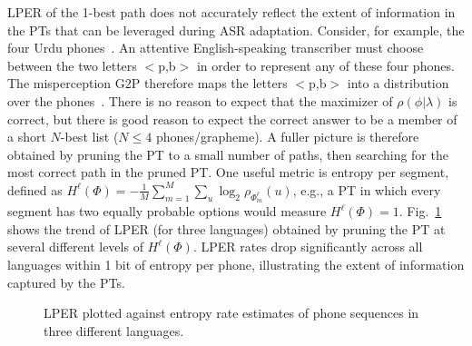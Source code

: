 

LPER of the 1-best path does not
accurately reflect the extent of information in the PTs that can be
leveraged during ASR adaptation.  Consider, for example, the four
Urdu phones~.  An attentive
English-speaking transcriber must choose between the two letters
$<$p,b$>$ in order to represent any of these four phones.  The
misperception G2P therefore maps the letters $<$p,b$>$ into a
distribution over the phones~.
There is no reason to expect that the maximizer of
$\rho(\phi|\lambda)$ is correct, but there is good reason to expect
the correct answer to be a member of a short $N$-best list ($N\le 4$
phones/grapheme).  A fuller picture is therefore obtained by
{\color{blue} pruning the PT to
a small number of paths, then searching for the most correct path
in the pruned PT.  One useful metric is entropy per segment, defined
as $H^{\ell}(\Phi)=-\frac{1}{M}\sum_{m=1}^M\sum_{u} \log_2\rho_{\Phi_m^\ell}(u)$,
e.g., a PT in which every segment has two equally probable options 
would measure $H^\ell(\Phi)=1$.}
Fig.~\ref{fig:listPER}
shows the trend of LPER (for three languages) obtained by pruning
the PT at several different levels of $H^{\ell}(\Phi)$.
LPER rates drop significantly across all languages within 1
bit of entropy per phone, illustrating the extent of information
captured by the PTs.

\begin{figure}[t!]
  
  \vspace*{-0.5cm}
  \caption{LPER plotted against entropy rate estimates of phone sequences in three different languages.}
\label{fig:listPER}
\end{figure}

